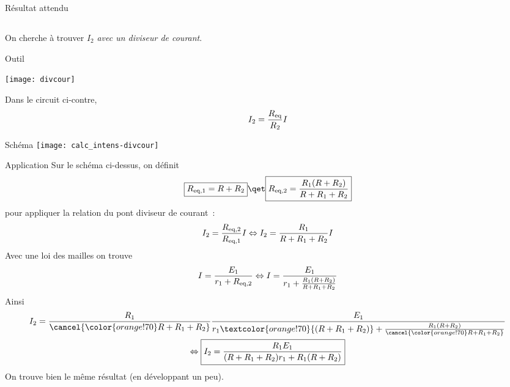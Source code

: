 \documentclass[a4paper, 12pt, final, garamond]{book}
\begin{document}
\begin{tcbraster}[raster columns=2, raster equal height=rows]
    \begin{NCprop}[]{Résultat attendu}
        \subsection{}
        On cherche à trouver $I_2$ \textit{avec un diviseur de courant}.
    \end{NCprop}
    \begin{NCrapp}[sidebyside, righthand ratio=0.4]{Outil}
        \begin{center}
            \texttt{[image: divcour]}
        \end{center}
        \tcblower
        \begin{center}
            Dans le circuit ci-contre,
            \[ I_2 = \frac{R_{\rm eq}}{R_2}I\]
        \end{center}
    \end{NCrapp}
\end{tcbraster}
\begin{NCdefi}[]{Schéma}
    \texttt{[image: calc\_intens-divcour]}
\end{NCdefi}
\begin{NCexem}{Application}
    Sur le schéma ci-dessus, on définit
    \[ \boxed{R_{\rm eq,1} = R+R_2} \qet \boxed{R_{\rm eq,2} =
        \frac{R_1(R+R_2)}{R + R_1 + R_2}}\]
    pour appliquer la relation du pont diviseur de courant~:
    \begin{equation*}
        I_2                 = \frac{R_{\rm eq, 2}}{R_{\rm eq,1}}I
        \Leftrightarrow I_2 = \frac{R_1}{R + R_1 + R_2}I
    \end{equation*}
    \tcblower
    Avec une loi des mailles on trouve
    \begin{equation*}
        I                 = \frac{E_1}{r_1 + R_{\rm eq,2}}
        \Leftrightarrow I = \frac{E_1}{r_1 + \frac{R_1(R+R_2)}{R + R_1 + R_2}}
    \end{equation*}
    Ainsi
    \begin{gather*}
        I_2 = \frac{R_1}{\cancel{\color{orange!70}R + R_1 + R_2}}
            \frac{E_1}{r_1 \textcolor{orange!70}{(R+R_1+R_2)}
                    + \frac{R_1(R+R_2)}{\cancel{\color{orange!70}R + R_1 +
                R_2}}}\\
        \Leftrightarrow \boxed{I_2 = \frac{R_1E_1}{(R+R_1+R_2)r_1 + R_1(R+R_2)}}
    \end{gather*}
    On trouve bien le même résultat (en développant un peu).
\end{NCexem}
\end{document}

